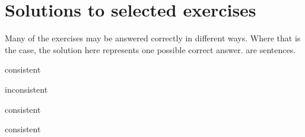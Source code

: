 \chapter[Solutions to selected exercises]{Solutions to selected exercises}
\label{app.solutions}

Many of the exercises may be answered correctly in different ways. Where that is the case, the solution here represents one possible correct answer.
{}
\nextSeq
\nextSeq
\noSeq
\nextSeq
\nextSeq
\nextSeq
\noSeq
\nextSeq
\noSeq
\lastSeq are sentences.

\begin{earg}
\item consistent
\item inconsistent
\item consistent
\item consistent
\end{earg}

